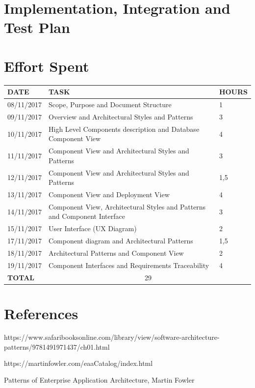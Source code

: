 \documentclass[12pt]{article}
\begin{document}
\section{Implementation, Integration and Test Plan}

\section{Effort Spent}

\begin{center}
\begin{tabular}{ |p{}|p{}|p{}| } 
 \hline
 \textbf{DATE} & \textbf{TASK} & \textbf{HOURS} \\ 
  \hline
 08/11/2017 &  Scope, Purpose and Document Structure & 1 \\ 
  \hline
 09/11/2017 & Overview and Architectural Styles and Patterns & 3 \\
  \hline
  10/11/2017 & High Level Components description and Database Component View & 4 \\ 
  \hline
  11/11/2017 & Component View and Architectural Styles and Patterns & 3 \\ 
  \hline
  12/11/2017 & Component View and Architectural Styles and Patterns & 1,5 \\ 
  \hline
  13/11/2017 & Component View and Deployment View & 4 \\ 
  \hline
  14/11/2017 & Component View, Architectural Styles and Patterns and Component Interface & 3 \\ 
  \hline
  15/11/2017 & User Interface (UX Diagram) & 2 \\ 
  \hline
  17/11/2017 & Component diagram and Architectural Patterns & 1,5 \\
  \hline
  18/11/2017 & Architectural Patterns and Component View & 2 \\
  \hline
  19/11/2017 & Component Interfaces and Requirements Traceability & 4 \\
  \hline
  \textbf{TOTAL} & \multicolumn{2}{c|}{29} \\ 
  \hline
\end{tabular}
\end{center}

\section{References}
https://www.safaribooksonline.com/library/view/software-architecture-patterns/9781491971437/ch01.html

https://martinfowler.com/eaaCatalog/index.html

Patterns of Enterprise Application Architecture, Martin Fowler
\end{document}
